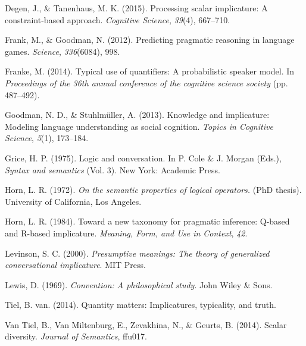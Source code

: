 \documentclass[10pt, letterpaper]{article}
\begin{document}
Degen, J., \& Tanenhaus, M. K. (2015). Processing scalar implicature: A
constraint-based approach. \emph{Cognitive Science}, \emph{39}(4),
667--710.

Frank, M., \& Goodman, N. (2012). Predicting pragmatic reasoning in
language games. \emph{Science}, \emph{336}(6084), 998.

Franke, M. (2014). Typical use of quantifiers: A probabilistic speaker
model. In \emph{Proceedings of the 36th annual conference of the
cognitive science society} (pp. 487--492).

Goodman, N. D., \& Stuhlm{ü}ller, A. (2013). Knowledge and implicature:
Modeling language understanding as social cognition. \emph{Topics in
Cognitive Science}, \emph{5}(1), 173--184.

Grice, H. P. (1975). Logic and conversation. In P. Cole \& J. Morgan
(Eds.), \emph{Syntax and semantics} (Vol. 3). New York: Academic Press.

Horn, L. R. (1972). \emph{On the semantic properties of logical
operators.} (PhD thesis). University of California, Los Angeles.

Horn, L. R. (1984). Toward a new taxonomy for pragmatic inference:
Q-based and R-based implicature. \emph{Meaning, Form, and Use in
Context}, \emph{42}.

Levinson, S. C. (2000). \emph{Presumptive meanings: The theory of
generalized conversational implicature}. MIT Press.

Lewis, D. (1969). \emph{Convention: A philosophical study}. John Wiley
\& Sons.

Tiel, B. van. (2014). Quantity matters: Implicatures, typicality, and
truth.

Van Tiel, B., Van Miltenburg, E., Zevakhina, N., \& Geurts, B. (2014).
Scalar diversity. \emph{Journal of Semantics}, ffu017.
\end{document}
